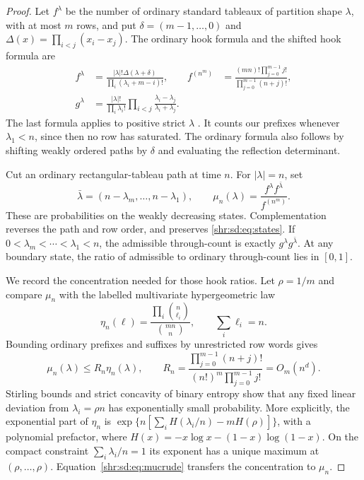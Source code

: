 \documentclass[11pt,letterpaper]{article}
\numberwithin{equation}{section}
\theoremstyle{definition}
\newcommand{\1}{\mathbf 1}
\newcommand{\D}{\Delta}
\begin{document}
\begin{proof}
Let $f^\lambda$ be the number of ordinary standard tableaux of partition shape $\lambda$, with at most $m$ rows, and put $\delta=(m-1,\ldots,0)$ and $\D(x)=\prod_{i<j}(x_i-x_j)$. The ordinary hook formula and the shifted hook formula are
\begin{align}
 f^\lambda&=\frac{|\lambda|!\D(\lambda+\delta)}
                  {\prod_i(\lambda_i+m-i)!},&
 f^{(n^m)}&=\frac{(mn)!\prod_{j=0}^{m-1}j!}
                  {\prod_{j=0}^{m-1}(n+j)!},\label{shr:sd:eq:ordinary}\\
 g^\lambda&=\frac{|\lambda|!}{\prod_i\lambda_i!}
                  \prod_{i<j}\frac{\lambda_i-\lambda_j}{\lambda_i+\lambda_j}.
                  \label{shr:sd:eq:shifted}
\end{align}
The last formula applies to positive strict $\lambda$ \cite[equation (1)]{Sun}. It counts our prefixes whenever $\lambda_1<n$, since then no row has saturated. The ordinary formula also follows by shifting weakly ordered paths by $\delta$ and evaluating the reflection determinant.

Cut an ordinary rectangular-tableau path at time $n$. For $|\lambda|=n$, set
\[
 \bar\lambda=(n-\lambda_m,\ldots,n-\lambda_1),\qquad
 \mu_n(\lambda)=\frac{f^\lambda f^{\bar\lambda}}{f^{(n^m)}}.
\]
These are probabilities on the weakly decreasing states. Complementation reverses the path and row order, and preserves \eqref{shr:sd:eq:states}. If $0<\lambda_m<\cdots<\lambda_1<n$, the admissible through-count is exactly $g^\lambda g^{\bar\lambda}$. At any boundary state, the ratio of admissible to ordinary through-count lies in $[0,1]$.

We record the concentration needed for those hook ratios. Let $\rho=1/m$ and compare $\mu_n$ with the labelled multivariate hypergeometric law
\[
 \eta_n(\ell)=\frac{\prod_i\binom n{\ell_i}}{\binom{mn}n},
 \qquad\sum_i\ell_i=n.
\]
Bounding ordinary prefixes and suffixes by unrestricted row words gives
\begin{equation}\label{shr:sd:eq:mucrude}
 \mu_n(\lambda)\le R_n\eta_n(\lambda),\qquad
 R_n=\frac{\prod_{j=0}^{m-1}(n+j)!}
           {(n!)^m\prod_{j=0}^{m-1}j!}=O_m(n^d).
\end{equation}
Stirling bounds and strict concavity of binary entropy show that any fixed linear deviation from $\lambda_i=\rho n$ has exponentially small probability. More explicitly, the exponential part of $\eta_n$ is
$\exp\{n[\sum_i H(\lambda_i/n)-mH(\rho)]\}$, with a polynomial prefactor, where $H(x)=-x\log x-(1-x)\log(1-x)$. On the compact constraint $\sum_i\lambda_i/n=1$ its exponent has a unique maximum at $(\rho,\ldots,\rho)$. Equation~\eqref{shr:sd:eq:mucrude} transfers the concentration to $\mu_n$.


\end{proof}
\end{document}

